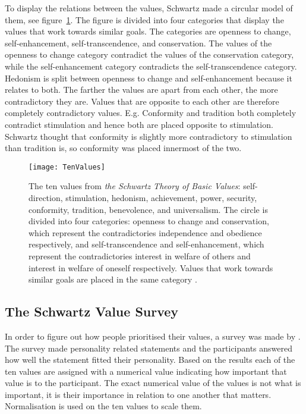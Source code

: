 To display the relations between the values, Schwartz made a circular model of them, see figure~\ref{fig:TenValuesSchwartz}. The figure is divided into four categories that display the values that work towards similar goals. The categories are openness to change, self-enhancement, self-transcendence, and conservation. The values of the openness to change category contradict the values of the conservation category, while the self-enhancement category contradicts the self-transcendence category. Hedonism is split between openness to change and self-enhancement because it relates to both. The farther the values are apart from each other, the more contradictory they are. Values that are opposite to each other are therefore completely contradictory values. E.g. Conformity and tradition both completely contradict stimulation and hence both are placed opposite to stimulation. Schwartz thought that conformity is slightly more contradictory to stimulation than tradition is, so conformity was placed innermost of the two.

\begin{figure}
    \centering
    \texttt{[image: TenValues]}   
    \caption[The ten values from \textit{the Schwartz Theory of Basic Values}.]{The ten values from \textit{the Schwartz Theory of Basic Values}: self-direction, stimulation, hedonism, achievement, power, security, conformity, tradition, benevolence, and universalism. The circle is divided into four categories: openness to change and conservation, which represent the contradictories independence and obedience respectively, and self-transcendence and self-enhancement, which represent the contradictories interest in welfare of others and interest in welfare of oneself respectively. Values that work towards similar goals are placed in the same category \citep{schwartz2012overview}.}
    \label{fig:TenValuesSchwartz}
\end{figure}

\subsection{The Schwartz Value Survey}
In order to figure out how people prioritised their values, a survey was made by \citet{schwartz2012overview}. The survey made personality related statements and the participants answered how well the statement fitted their personality. Based on the results each of the ten values are assigned with a numerical value indicating how important that value is to the participant. The exact numerical value of the values is not what is important, it is their importance in relation to one another that matters. Normalisation is used on the ten values to scale them. 

